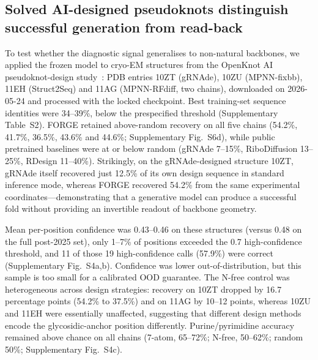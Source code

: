 \subsection{Solved AI-designed pseudoknots distinguish successful generation from read-back}

To test whether the diagnostic signal generalises to non-natural backbones, we
applied the frozen model to cryo-EM structures from the OpenKnot AI
pseudoknot-design study~\citep{townley2026openknot}: PDB entries 10ZT
(gRNAde), 10ZU (MPNN-fixbb), 11EH (Struct2Seq) and 11AG (MPNN-RFdiff, two
chains), downloaded on 2026-05-24 and processed with the locked checkpoint.
Best training-set sequence identities were 34--39\%, below the prespecified
threshold (Supplementary Table~S2). FORGE retained above-random recovery on
all five chains (54.2\%, 41.7\%, 36.5\%, 43.6\% and 44.6\%;
Supplementary Fig.~S6d), while public pretrained baselines were at or
below random (gRNAde 7--15\%, RiboDiffusion 13--25\%, RDesign 11--40\%). Strikingly, on the gRNAde-designed structure 10ZT, gRNAde itself recovered just 12.5\% of its own design sequence in standard inference mode, whereas FORGE recovered 54.2\% from the same experimental coordinates—demonstrating that a generative model can produce a successful fold without providing an invertible readout of backbone geometry.

Mean per-position
confidence was 0.43--0.46 on these structures (versus 0.48 on the full
post-2025 set), only 1--7\% of positions exceeded the 0.7 high-confidence
threshold, and 11 of those 19 high-confidence calls (57.9\%) were correct
(Supplementary Fig.~S4a,b). Confidence was lower out-of-distribution, but this sample is
too small for a calibrated OOD guarantee. The
N-free control was heterogeneous across design strategies: recovery on 10ZT
dropped by 16.7 percentage points (54.2\% to 37.5\%) and on 11AG by 10--12
points, whereas 10ZU and 11EH were essentially unaffected, suggesting that
different design methods encode the glycosidic-anchor position differently.
Purine/pyrimidine accuracy remained above chance on all chains (7-atom,
65--72\%; N-free, 50--62\%; random 50\%; Supplementary Fig.~S4c).

